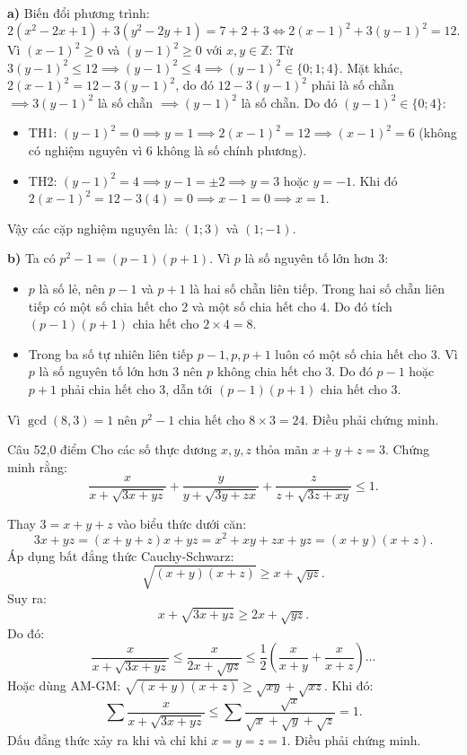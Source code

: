 \begin{loi_giai_cau}
\textbf{a)} Biến đổi phương trình:
\[2(x^2-2x+1) + 3(y^2-2y+1) = 7 + 2 + 3 \iff 2(x-1)^2 + 3(y-1)^2 = 12.\]
Vì $(x-1)^2 \ge 0$ và $(y-1)^2 \ge 0$ với $x, y \in \mathbb{Z}$:
Từ $3(y-1)^2 \le 12 \implies (y-1)^2 \le 4 \implies (y-1)^2 \in \{0; 1; 4\}$.
Mặt khác, $2(x-1)^2 = 12 - 3(y-1)^2$, do đó $12 - 3(y-1)^2$ phải là số chẵn $\implies 3(y-1)^2$ là số chẵn $\implies (y-1)^2$ là số chẵn.
Do đó $(y-1)^2 \in \{0; 4\}$:
\begin{itemize}
\item TH1: $(y-1)^2 = 0 \implies y = 1 \implies 2(x-1)^2 = 12 \implies (x-1)^2 = 6$ (không có nghiệm nguyên vì 6 không là số chính phương).
\item TH2: $(y-1)^2 = 4 \implies y - 1 = \pm 2 \implies y = 3$ hoặc $y = -1$.
Khi đó $2(x-1)^2 = 12 - 3(4) = 0 \implies x - 1 = 0 \implies x = 1$.
\end{itemize}
Vậy các cặp nghiệm nguyên là: $\boxed{(1; 3)}$ và $\boxed{(1; -1)}$.

\textbf{b)} Ta có $p^2 - 1 = (p-1)(p+1)$.
Vì $p$ là số nguyên tố lớn hơn 3:
\begin{itemize}
\item $p$ là số lẻ, nên $p-1$ và $p+1$ là hai số chẵn liên tiếp. Trong hai số chẵn liên tiếp có một số chia hết cho 2 và một số chia hết cho 4.
Do đó tích $(p-1)(p+1)$ chia hết cho $2 \times 4 = 8$.
\item Trong ba số tự nhiên liên tiếp $p-1, p, p+1$ luôn có một số chia hết cho 3. Vì $p$ là số nguyên tố lớn hơn 3 nên $p$ không chia hết cho 3. Do đó $p-1$ hoặc $p+1$ phải chia hết cho 3, dẫn tới $(p-1)(p+1)$ chia hết cho 3.
\end{itemize}
Vì $\gcd(8, 3) = 1$ nên $p^2 - 1$ chia hết cho $8 \times 3 = 24$. Điều phải chứng minh.
\end{loi_giai_cau}

\begin{de_cau}{Câu 5}{2,0 điểm}
Cho các số thực dương $x, y, z$ thỏa mãn $x + y + z = 3$. Chứng minh rằng:
\[\dfrac{x}{x + \sqrt{3x + yz}} + \dfrac{y}{y + \sqrt{3y + zx}} + \dfrac{z}{z + \sqrt{3z + xy}} \le 1.\]
\end{de_cau}

\begin{loi_giai_cau}
Thay $3 = x+y+z$ vào biểu thức dưới căn:
\[3x + yz = (x+y+z)x + yz = x^2 + xy + zx + yz = (x+y)(x+z).\]
Áp dụng bất đẳng thức Cauchy-Schwarz:
\[\sqrt{(x+y)(x+z)} \ge x + \sqrt{yz}.\]
Suy ra:
\[x + \sqrt{3x+yz} \ge 2x + \sqrt{yz}.\]
Do đó:
\[\frac{x}{x + \sqrt{3x+yz}} \le \frac{x}{2x + \sqrt{yz}} \le \frac{1}{2}\left(\frac{x}{x+y} + \frac{x}{x+z}\right) \dots\]
Hoặc dùng AM-GM: $\sqrt{(x+y)(x+z)} \ge \sqrt{xy} + \sqrt{xz}$.
Khi đó:
\[\sum \frac{x}{x + \sqrt{3x+yz}} \le \sum \frac{\sqrt{x}}{\sqrt{x}+\sqrt{y}+\sqrt{z}} = 1.\]
Dấu đẳng thức xảy ra khi và chỉ khi $x = y = z = 1$. Điều phải chứng minh.
\end{loi_giai_cau}
